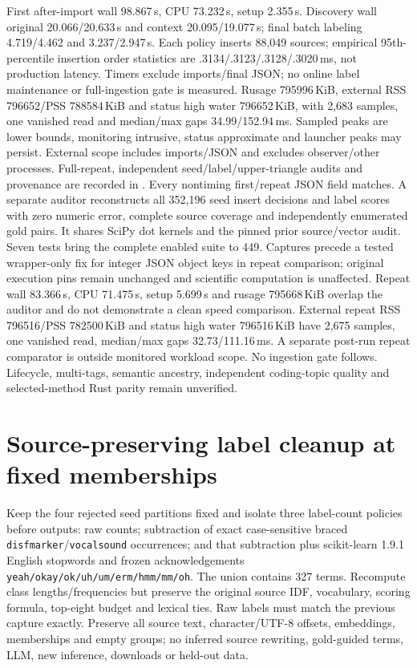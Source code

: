 \documentclass[11pt]{article}
\begin{document}
First after-import wall 98.867\,s, CPU 73.232\,s, setup 2.355\,s. Discovery wall
original 20.066/20.633\,s and context 20.095/19.077\,s; final batch labeling
4.719/4.462 and 3.237/2.947\,s. Each policy inserts 88,049 sources; empirical
95th-percentile insertion order statistics are .3134/.3123/.3128/.3020\,ms,
not production latency. Timers exclude imports/final JSON; no online label
maintenance or full-ingestion gate is measured. Rusage 795996\,KiB, external
RSS 796652/PSS 788584\,KiB and status high water 796652\,KiB, with 2,683 samples,
one vanished read and median/max gaps 34.99/152.94\,ms. Sampled peaks are lower
bounds, monitoring intrusive, status approximate and launcher peaks may persist.
External scope includes imports/JSON and excludes observer/other processes.
Full-repeat, independent seed/label/upper-triangle audits and provenance are
recorded in .
Every nontiming first/repeat JSON field matches. A separate auditor reconstructs
all 352,196 seed insert decisions and label scores with zero numeric error,
complete source coverage and independently enumerated gold pairs. It shares
SciPy dot kernels and the pinned prior source/vector audit. Seven tests bring
the complete enabled suite to 449. Captures precede a tested wrapper-only fix
for integer JSON object keys in repeat comparison; original execution pins
remain unchanged and scientific computation is unaffected.
Repeat wall 83.366\,s, CPU 71.475\,s, setup 5.699\,s and rusage 795668\,KiB overlap
the auditor and do not demonstrate a clean speed comparison. External repeat
RSS 796516/PSS 782500\,KiB and status high water 796516\,KiB have 2,675 samples,
one vanished read, median/max gaps 32.73/111.16\,ms. A separate post-run repeat
comparator is outside monitored workload scope. No ingestion gate follows.
Lifecycle, multi-tags, semantic ancestry, independent coding-topic quality and
selected-method Rust parity remain unverified.

\section{Source-preserving label cleanup at fixed memberships}
Keep the four rejected seed partitions fixed and isolate three label-count
policies before outputs: raw counts; subtraction of exact case-sensitive braced
\texttt{disfmarker}/\texttt{vocalsound} occurrences; and that subtraction plus
scikit-learn 1.9.1 English stopwords and frozen acknowledgements
\texttt{yeah/okay/ok/uh/um/erm/hmm/mm/oh}. The union contains 327 terms.
Recompute class lengths/frequencies but preserve the original source IDF,
vocabulary, scoring formula, top-eight budget and lexical ties. Raw labels must
match the previous capture exactly. Preserve all source text, character/UTF-8
offsets, embeddings, memberships and empty groups; no inferred source rewriting,
gold-guided terms, LLM, new inference, downloads or held-out data.
\end{document}
